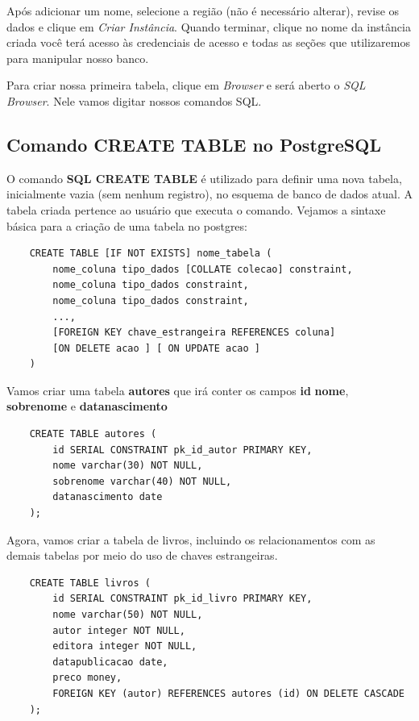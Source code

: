 Após adicionar um nome, selecione a região (não é necessário alterar), revise os dados e clique em \textit{Criar Instância}. Quando terminar, clique no nome da instância criada você terá acesso às credenciais de acesso e todas as seções que utilizaremos para manipular nosso banco. 

Para criar nossa primeira tabela, clique em \textit{Browser} e será aberto o \textit{SQL Browser}. Nele vamos digitar nossos comandos SQL.

\subsection{Comando CREATE TABLE no PostgreSQL}

O comando \textbf{SQL CREATE TABLE} é utilizado para definir uma nova tabela, inicialmente vazia (sem nenhum registro), no esquema de banco de dados atual. A tabela criada pertence ao usuário que executa o comando. Vejamos a sintaxe básica para a criação de uma tabela no postgres:

\begin{verbatim}
	CREATE TABLE [IF NOT EXISTS] nome_tabela (
		nome_coluna tipo_dados [COLLATE colecao] constraint,
		nome_coluna tipo_dados constraint,
		nome_coluna tipo_dados constraint,
		...,
		[FOREIGN KEY chave_estrangeira REFERENCES coluna]
		[ON DELETE acao ] [ ON UPDATE acao ]
	)
\end{verbatim}

Vamos criar uma tabela \textbf{autores} que irá conter os campos \textbf{id} \textbf{nome}, \textbf{sobrenome} e \textbf{datanascimento}

\begin{verbatim}
	CREATE TABLE autores (
		id SERIAL CONSTRAINT pk_id_autor PRIMARY KEY,
		nome varchar(30) NOT NULL, 
		sobrenome varchar(40) NOT NULL,
		datanascimento date
	);
\end{verbatim}

Agora, vamos criar a tabela de livros, incluindo os relacionamentos com as demais tabelas por meio do uso de chaves estrangeiras.

\begin{verbatim}
	CREATE TABLE livros (
		id SERIAL CONSTRAINT pk_id_livro PRIMARY KEY,
		nome varchar(50) NOT NULL,
		autor integer NOT NULL,
		editora integer NOT NULL,
		datapublicacao date,
		preco money,
		FOREIGN KEY (autor) REFERENCES autores (id) ON DELETE CASCADE
	);
\end{verbatim}

